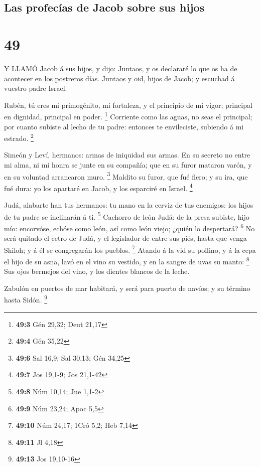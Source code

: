 \hypertarget{las-profecuxedas-de-jacob-sobre-sus-hijos}{%
\subsection{Las profecías de Jacob sobre sus
hijos}\label{las-profecuxedas-de-jacob-sobre-sus-hijos}}

\hypertarget{section-48}{%
\section{49}\label{section-48}}

 Y LLAMÓ Jacob á sus hijos, y dijo: Juntaos, y os declararé
lo que os ha de acontecer en los postreros días.  Juntaos y
oid, hijos de Jacob; y escuchad á vuestro padre Israel.

 Rubén, tú eres mi primogénito, mi fortaleza, y el principio
de mi vigor; principal en dignidad, principal en poder. \footnote{\textbf{49:3}
  Gén 29,32; Deut 21,17}  Corriente como las aguas, no seas
el principal; por cuanto subiste al lecho de tu padre: entonces te
envileciste, subiendo á mi estrado. \footnote{\textbf{49:4} Gén 35,22}

 Simeón y Leví, hermanos: armas de iniquidad sus armas.
 En su secreto no entre mi alma, ni mi honra se junte en su
compañía; que en su furor mataron varón, y en su voluntad arrancaron
muro. \footnote{\textbf{49:6} Sal 16,9; Sal 30,13; Gén 34,25}
 Maldito su furor, que fué fiero; y su ira, que fué dura: yo
los apartaré en Jacob, y los esparciré en Israel. \footnote{\textbf{49:7}
  Jos 19,1-9; Jos 21,1-42}

 Judá, alabarte han tus hermanos: tu mano en la cerviz de
tus enemigos: los hijos de tu padre se inclinarán á ti. \footnote{\textbf{49:8}
  Núm 10,14; Jue 1,1-2}  Cachorro de león Judá: de la presa
subiste, hijo mío: encorvóse, echóse como león, así como león viejo;
¿quién lo despertará? \footnote{\textbf{49:9} Núm 23,24; Apoc 5,5}
 No será quitado el cetro de Judá, y el legislador de entre
sus piés, hasta que venga Shiloh; y á él se congregarán los pueblos.
\footnote{\textbf{49:10} Núm 24,17; 1Cró 5,2; Heb 7,14} 
Atando á la vid su pollino, y á la cepa el hijo de su asna, lavó en el
vino su vestido, y en la sangre de uvas su manto: \footnote{\textbf{49:11}
  Jl 4,18}  Sus ojos bermejos del vino, y los dientes
blancos de la leche.

 Zabulón en puertos de mar habitará, y será para puerto de
navíos; y su término hasta Sidón. \footnote{\textbf{49:13} Jos 19,10-16}

